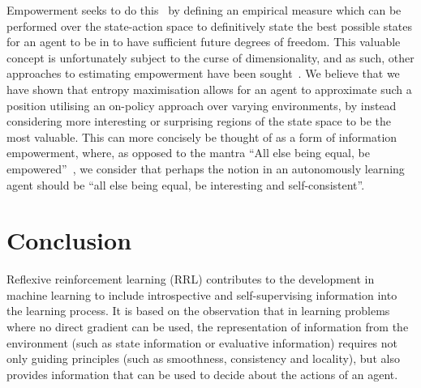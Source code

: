 \documentclass{article}
\begin{document}
Empowerment seeks to do this~\cite{salge2014empowerment} by defining an empirical measure which can be performed over the state-action space to definitively state the best possible states for an agent to be in to have sufficient future degrees of freedom. This valuable concept is unfortunately subject to the curse of dimensionality, and as such, other approaches to estimating empowerment have been sought~\cite{zhao2019learning}. We believe that we have shown that entropy maximisation allows for an agent to approximate such a position utilising an on-policy approach over varying environments, by instead considering more interesting or surprising regions of the state space to be the most valuable.
This can more concisely be thought of as a form of information empowerment, where, as opposed to the mantra ``All else being equal, be empowered''~\cite{klyubin2005all}, we consider that perhaps the notion in an autonomously learning agent should be ``all else being equal, be interesting and self-consistent''.





\section{Conclusion}

Reflexive reinforcement learning (RRL) contributes to the development in machine learning
to include introspective and self-supervising information into the learning process. 
It is based on the observation that in learning problems where no direct gradient can be used, the representation of information from the environment (such as state information or evaluative information) requires not only guiding principles (such as smoothness, consistency and locality), but also provides information that can be used to decide about the actions of an agent.
\end{document}
